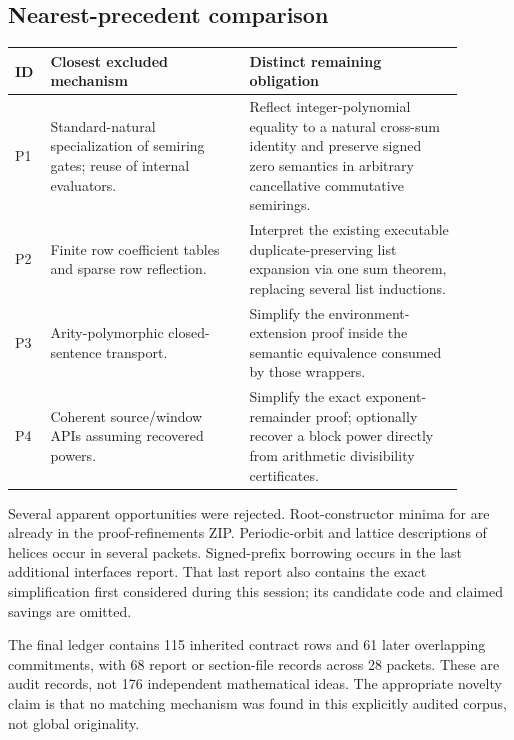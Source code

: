 \subsection{Nearest-precedent comparison}

\begin{longtable}{L{0.06\linewidth}L{0.40\linewidth}L{0.43\linewidth}}
\toprule ID & Closest excluded mechanism & Distinct remaining obligation\\ \midrule
P1 & Standard-natural specialization of semiring gates; reuse of internal
evaluators. &
Reflect integer-polynomial equality to a natural cross-sum identity and
preserve signed zero semantics in arbitrary cancellative commutative semirings.\\
P2 & Finite row coefficient tables and sparse row reflection. &
Interpret the existing executable duplicate-preserving list expansion via
one sum theorem, replacing several list inductions.\\
P3 & Arity-polymorphic closed-sentence transport. &
Simplify the environment-extension proof inside the semantic equivalence
consumed by those wrappers.\\
P4 & Coherent source/window APIs assuming recovered powers. &
Simplify the exact exponent-remainder proof; optionally recover a block
power directly from arithmetic divisibility certificates.\\
\bottomrule
\end{longtable}

Several apparent opportunities were rejected. Root-constructor minima for
 are already in the proof-refinements ZIP.
Periodic-orbit and lattice descriptions of helices occur in several packets.
Signed-prefix borrowing occurs in the last additional interfaces report.
That last report also contains the exact
 simplification first considered
during this session; its candidate code and claimed savings are omitted.

The final ledger contains 115 inherited contract rows and 61 later overlapping
commitments, with 68 report or section-file records across 28 packets.
These are audit records, not 176 independent mathematical ideas.
The appropriate novelty claim is that no matching mechanism was found in
this explicitly audited corpus, not global originality.
